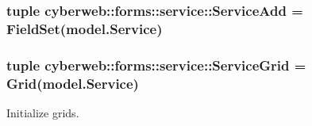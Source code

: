 \hypertarget{namespacecyberweb_1_1forms_1_1service_a5844aa892506a7e223b5a6764c2a7eec}{
\subsubsection[{\-Service\-Add}]{\setlength{\rightskip}{0pt plus 5cm}tuple {\bf cyberweb\-::forms\-::service\-::\-Service\-Add} = \-Field\-Set(model.\-Service)}}\label{namespacecyberweb_1_1forms_1_1service_a5844aa892506a7e223b5a6764c2a7eec}
\hypertarget{namespacecyberweb_1_1forms_1_1service_a7f336b673bbc1bbf67e92ceb309fee98}{
\subsubsection[{\-Service\-Grid}]{\setlength{\rightskip}{0pt plus 5cm}tuple {\bf cyberweb\-::forms\-::service\-::\-Service\-Grid} = \-Grid(model.\-Service)}}\label{namespacecyberweb_1_1forms_1_1service_a7f336b673bbc1bbf67e92ceb309fee98}


\-Initialize grids. 

